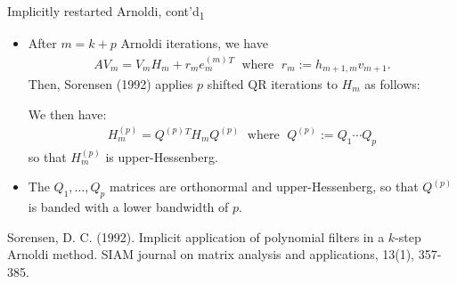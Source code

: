 \documentclass[t,usepdftitle=false]{beamer}
\begin{document}
\begin{frame}{Implicitly restarted Arnoldi, cont'd\textsubscript{1}}
\begin{itemize}
\item After $m=k+p$ Arnoldi iterations, we have
\begin{align*}
AV_m=V_mH_m+r_me_m^{(m)}{}^T
\;\text{ where }\;
r_m:=h_{m+1,m}v_{m+1}.
\end{align*}
Then, Sorensen (1992) applies $p$ shifted QR iterations to $H_m$ as follows:
\vspace{.05cm}
\begin{center}\end{center}
We then have:
\begin{align*}
H_m^{(p)}=Q^{(p)}{}^TH_mQ^{(p)}
\;\text{ where }\;
Q^{(p)}:=Q_1\cdots Q_p
\end{align*}
so that $H^{(p)}_m$ is upper-Hessenberg.
\item[] The $Q_1,\dots,Q_p$ matrices are orthonormal and upper-Hessenberg, so that $Q^{(p)}$ is banded with a lower bandwidth of $p$.
\end{itemize}\smallskip
\tiny{Sorensen, D. C. (1992). Implicit application of polynomial filters in a $k$-step Arnoldi method. SIAM journal on matrix analysis and applications, 13(1), 357-385.}
\end{frame}
\end{document}
